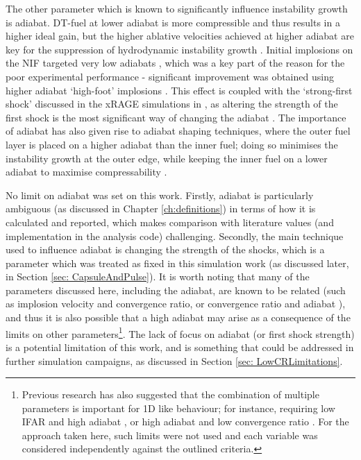 The other parameter which is known to significantly influence instability growth is adiabat. DT-fuel at lower adiabat is more compressible and thus results in a higher ideal gain, but the higher ablative velocities achieved at higher adiabat are key for the suppression of hydrodynamic instability growth \cite{Betti2016}. Initial implosions on the NIF targeted very low adiabats \cite{Lindl2014}, which was a key part of the reason for the poor experimental performance - significant improvement was obtained using higher adiabat `high-foot' implosions \cite{Hurricane2014}. This effect is coupled with the `strong-first shock' discussed in the xRAGE simulations in \cite{Haines2017a}, as altering the strength of the first shock is the most significant way of changing the adiabat \cite{Robey2013,Haines2017a,Haines2019a}. The importance of adiabat has also given rise to adiabat shaping techniques, where the outer fuel layer is placed on a higher adiabat than the inner fuel; doing so minimises the instability growth at the outer edge, while keeping the inner fuel on a lower adiabat to maximise compressability \cite{Goncharov2003}.

No limit on adiabat was set on this work. Firstly, adiabat is particularly ambiguous (as discussed in Chapter \ref{ch:definitions}) in terms of how it is calculated and reported, which makes comparison with literature values (and implementation in the analysis code) challenging. Secondly, the main technique used to influence adiabat is changing the strength of the shocks, which is a parameter which was treated as fixed in this simulation work (as discussed later, in Section \ref{sec: CapsuleAndPulse}). It is worth noting that many of the parameters discussed here, including the adiabat, are known to be related (such as implosion velocity and convergence ratio, or convergence ratio and adiabat \cite{Goncharov2013, Landen2021}), and thus it is also possible that a high adiabat may arise as a consequence of the limits on other parameters\footnote{ Previous research has also suggested that the combination of multiple parameters is important for 1D like behaviour; for instance, requiring low IFAR and high adiabat \cite{Goncharov2014}, or high adiabat and low convergence ratio \cite{Goncharov2003}. For the approach taken here, such limits were not used and each variable was considered independently against the outlined criteria.}. The lack of focus on adiabat (or first shock strength) is a potential limitation of this work, and is something that could be addressed in further simulation campaigns, as discussed in Section \ref{sec: LowCRLimitations}.

